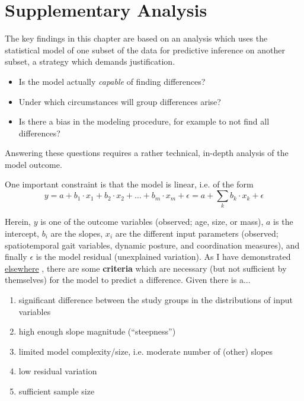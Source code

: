 \section{Supplementary Analysis}\label{supp:linearmodels}
\begin{change}
The key findings in this chapter are based on an analysis which uses the statistical model of one subset of the data for predictive inference on another subset, a strategy which demands justification.
\begin{itemize}
\item Is the model actually \textit{capable} of finding differences?
\item Under which circumstances will group differences arise?
\item Is there a bias in the modeling procedure, for example to not find all differences?
\end{itemize}
Answering these questions requires a rather technical, in-depth analysis of the model outcome.

One important constraint is that the model is linear, i.e. of the form
\[y = a + b_1 \cdot x_1 + b_2 \cdot x_2 + \ldots + b_m \cdot x_m + \epsilon = a + \sum\limits_k b_k \cdot x_k + \epsilon\]

Herein, \(y\) is one of the outcome variables (observed; age, size, or mass), \(a\) is the intercept, \(b_i\) are the slopes, \(x_i\) are the different input parameters (observed; spatiotemporal gait variables, dynamic posture, and coordination measures), and finally \(\epsilon\) is the model residual (unexplained variation).
As I have demonstrated \href{http://mielke-bio.info/falk/posts/33.linearmodels}{elsewhere} \citep{Mielke2024lm}, there are some \textbf{criteria} which are necessary (but not sufficient by themselves) for the model to predict a difference.
Given there is a...
\begin{enumerate}
\item significant difference between the study groups in the distributions of input variables
\item high enough slope magnitude (``steepness'')
\item limited model complexity/size, i.e. moderate number of (other) slopes
\item low residual variation
\item sufficient sample size
\end{enumerate}


\end{change}
